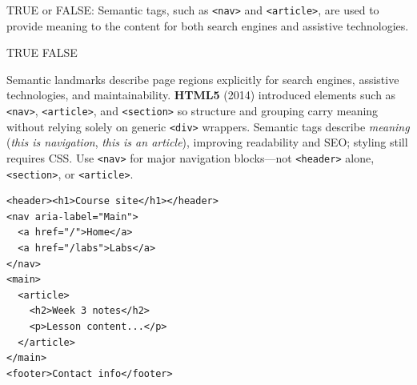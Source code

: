 \question[4]
TRUE or FALSE: Semantic tags, such as \texttt{<nav>} and \texttt{<article>}, are used to provide meaning to the content for both search engines and assistive technologies.
\begin{choices}
  \CorrectChoice TRUE
  \choice FALSE
\end{choices}
\begin{solution}
  Semantic landmarks describe page regions explicitly for search engines, assistive technologies, and maintainability. \textbf{HTML5} (2014) introduced elements such as \texttt{<nav>}, \texttt{<article>}, and \texttt{<section>} so structure and grouping carry meaning without relying solely on generic \texttt{<div>} wrappers. Semantic tags describe \emph{meaning} (\emph{this is navigation}, \emph{this is an article}), improving readability and SEO; styling still requires CSS. Use \texttt{<nav>} for major navigation blocks---not \texttt{<header>} alone, \texttt{<section>}, or \texttt{<article>}.
\begin{lstlisting}[style=htmlinline]
<header><h1>Course site</h1></header>
<nav aria-label="Main">
  <a href="/">Home</a>
  <a href="/labs">Labs</a>
</nav>
<main>
  <article>
    <h2>Week 3 notes</h2>
    <p>Lesson content...</p>
  </article>
</main>
<footer>Contact info</footer>
\end{lstlisting}
\end{solution}

